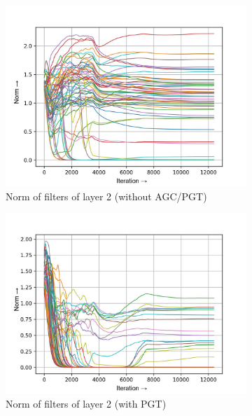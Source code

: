 \documentclass[times,sort&compress]{elsarticle}
\begin{document}
\begin{figure}[t]
\begin{subfigure}[t]{0.33\textwidth}
\includegraphics[width=\textwidth]{baseline-w-layer-1-2}
\caption{Norm of filters of layer 2 (without AGC/PGT)}
\end{subfigure}
\begin{subfigure}[t]{0.33\textwidth}
\includegraphics[width=\textwidth]{pgt-w-layer-1-2}
\caption{Norm of filters of layer 2 (with PGT)}
\end{subfigure}
\begin{subfigure}[t]{0.33\textwidth}

\end{subfigure}
\end{figure}
\end{document}
